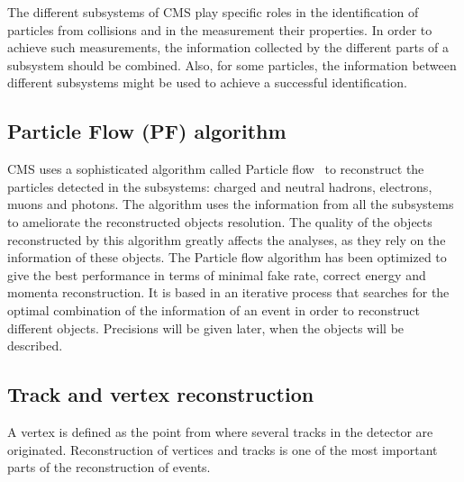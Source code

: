 The different subsystems of CMS play specific roles in the identification of particles from collisions and in the measurement their properties. In order to achieve such measurements, the information collected by the different parts of a subsystem should be combined. Also, for some particles, the information between different subsystems might be used to achieve a successful identification.%

\subsection{Particle Flow (PF) algorithm}

CMS uses a sophisticated algorithm called Particle flow~\cite{CMS:2009nxa,CMS:2010eua,CMS:2010byl,CMS:2010aua} to reconstruct the particles detected in the subsystems: charged and neutral hadrons, electrons, muons and photons. The algorithm uses the information from all the subsystems to ameliorate the reconstructed objects resolution.%
The quality of the objects reconstructed by this algorithm greatly affects the analyses, as they rely on the information of these objects. The Particle flow algorithm has been optimized to give the best performance in terms of minimal fake rate, correct energy and momenta reconstruction. It is based in an iterative process that searches for the optimal combination of the information of an event in order to reconstruct different objects. Precisions will be given later, when the objects will be described.

\subsection{Track and vertex reconstruction}

A vertex is defined as the point from where several tracks in the detector are originated. Reconstruction of vertices and tracks is one of the most important parts of the reconstruction of events.

